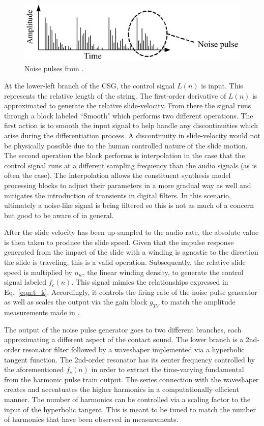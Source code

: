 \documentclass[main.tex]{subfiles}
\begin{document}
\begin{figure}[h]
    \centering
    \includegraphics[scale=1]{./images/pictures/noise_pulses.png}
    \caption{Noise pulses from .}
    \label{fig:noise_pulses_ch2}
\end{figure}

At the lower-left branch of the CSG, the control signal $L(n)$ is input. This represents the relative length of the string. The first-order derivative of $L(n)$ is approximated to generate the relative slide-velocity. From there the signal runs through a block labeled ``Smooth" which performs two different operations. The first action is to smooth the input signal to help handle any discontinuities which arise during the differentiation process. A discontinuity in slide-velocity would not be physically possible due to the human controlled nature of the slide motion. The second operation the block performs is interpolation in the case that the control signal runs at a different sampling frequency than the audio signals (as is often the case). The interpolation allows the constituent synthesis model processing blocks to adjust their parameters in a more gradual way as well and mitigates the introduction of transients in digital filters. In this scenario, ultimately a noise-like signal is being filtered so this is not as much of a concern but good to be aware of in general.

After the slide velocity has been up-sampled to the audio rate, the absolute value is then taken to produce the slide speed. Given that the impulse response generated from the impact of the slide with a winding is agnostic to the direction the slide is traveling, this is a valid operation. Subsequently, the relative slide speed is multiplied by $n_w$, the linear winding density, to generate the control signal labeled $f_c(n)$. This signal mimics the relationships expressed in Eq.~\ref{eqn:t_k}. Accordingly, it controls the firing rate of the noise pulse generator as well as scales the output via the gain block $g_{TV}$ to match the amplitude measurements made in .

The output of the noise pulse generator goes to two different branches, each approximating a different aspect of the contact sound. The lower branch is a 2nd-order resonator filter followed by a waveshaper implemented via a hyperbolic tangent function. The 2nd-order resonator has its center frequency controlled by the aforementioned $f_c(n)$ in order to extract the time-varying fundamental from the harmonic pulse train output. The series connection with the waveshaper creates and accentuates the higher harmonics in a computationally efficient manner. The number of harmonics can be controlled via a scaling factor to the input of the hyperbolic tangent. This is meant to be tuned to match the number of harmonics that have been observed in measurements.
\end{document}
